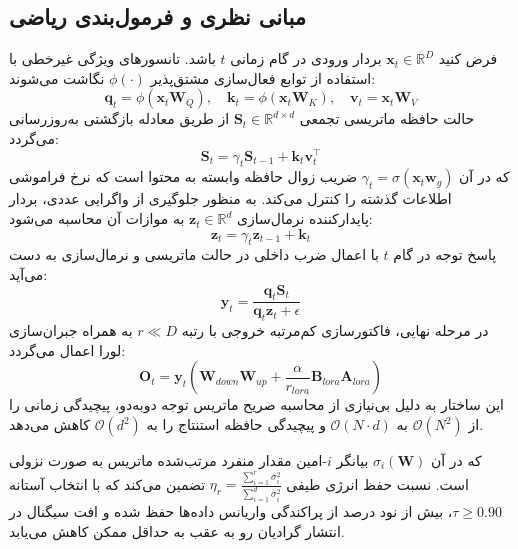 \subsection{مبانی نظری و فرمول‌بندی ریاضی}
فرض کنید $\mathbf{x}_t \in \mathbb{R}^D$ بردار ورودی در گام زمانی $t$ باشد. تانسورهای ویژگی غیرخطی با استفاده از توابع فعال‌سازی مشتق‌پذیر $\phi(\cdot)$ نگاشت می‌شوند:
\begin{equation}
\mathbf{q}_t = \phi(\mathbf{x}_t \mathbf{W}_Q), \quad \mathbf{k}_t = \phi(\mathbf{x}_t \mathbf{W}_K), \quad \mathbf{v}_t = \mathbf{x}_t \mathbf{W}_V
\end{equation}
حالت حافظه ماتریسی تجمعی $\mathbf{S}_t \in \mathbb{R}^{d \times d}$ از طریق معادله بازگشتی به‌روزرسانی می‌گردد:
\begin{equation}
\mathbf{S}_t = \gamma_t \mathbf{S}_{t-1} + \mathbf{k}_t \mathbf{v}_t^\top
\end{equation}
که در آن $\gamma_t = \sigma(\mathbf{x}_t \mathbf{w}_g)$ ضریب زوال حافظه وابسته به محتوا است که نرخ فراموشی اطلاعات گذشته را کنترل می‌کند. به منظور جلوگیری از واگرایی عددی، بردار پایدارکننده نرمال‌سازی $\mathbf{z}_t \in \mathbb{R}^d$ به موازات آن محاسبه می‌شود:
\begin{equation}
\mathbf{z}_t = \gamma_t \mathbf{z}_{t-1} + \mathbf{k}_t
\end{equation}
پاسخ توجه در گام $t$ با اعمال ضرب داخلی در حالت ماتریسی و نرمال‌سازی به دست می‌آید:
\begin{equation}
\mathbf{y}_t = \frac{\mathbf{q}_t \mathbf{S}_t}{\mathbf{q}_t \mathbf{z}_t + \epsilon}
\end{equation}
در مرحله نهایی، فاکتورسازی کم‌مرتبه خروجی با رتبه $r \ll D$ به همراه جبران‌سازی لورا اعمال می‌گردد:
\begin{equation}
\mathbf{O}_t = \mathbf{y}_t \left( \mathbf{W}_{down} \mathbf{W}_{up} + \frac{\alpha}{r_{lora}} \mathbf{B}_{lora} \mathbf{A}_{lora} \right)
\end{equation}
این ساختار به دلیل بی‌نیازی از محاسبه صریح ماتریس توجه دو‌به‌دو، پیچیدگی زمانی را از $\mathcal{O}(N^2)$ به $\mathcal{O}(N \cdot d)$ و پیچیدگی حافظه استنتاج را به $\mathcal{O}(d^2)$ کاهش می‌دهد.

که در آن $\sigma_i(\mathbf{W})$ بیانگر $i$-امین مقدار منفرد مرتب‌شده ماتریس به صورت نزولی است. نسبت حفظ انرژی طیفی $\eta_r = \frac{\sum_{i=1}^r \sigma_i^2}{\sum_{i=1}^{d} \sigma_i^2}$ تضمین می‌کند که با انتخاب آستانه $\tau \ge 0.90$، بیش از نود درصد از پراکندگی واریانس داده‌ها حفظ شده و افت سیگنال در انتشار گرادیان رو به عقب به حداقل ممکن کاهش می‌یابد.

